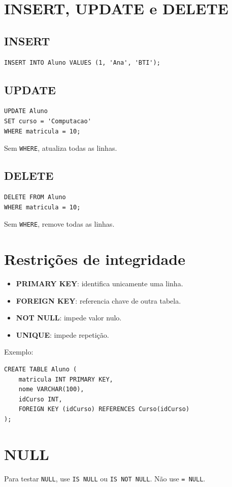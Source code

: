 \documentclass[12pt,a4paper]{article}
\begin{document}
\section{INSERT, UPDATE e DELETE}
\subsection{INSERT}
\begin{verbatim}
INSERT INTO Aluno VALUES (1, 'Ana', 'BTI');
\end{verbatim}

\subsection{UPDATE}
\begin{verbatim}
UPDATE Aluno
SET curso = 'Computacao'
WHERE matricula = 10;
\end{verbatim}
Sem \texttt{WHERE}, atualiza todas as linhas.

\subsection{DELETE}
\begin{verbatim}
DELETE FROM Aluno
WHERE matricula = 10;
\end{verbatim}
Sem \texttt{WHERE}, remove todas as linhas.

\section{Restrições de integridade}
\begin{itemize}
    \item \textbf{PRIMARY KEY}: identifica unicamente uma linha.
    \item \textbf{FOREIGN KEY}: referencia chave de outra tabela.
    \item \textbf{NOT NULL}: impede valor nulo.
    \item \textbf{UNIQUE}: impede repetição.
\end{itemize}

Exemplo:
\begin{verbatim}
CREATE TABLE Aluno (
    matricula INT PRIMARY KEY,
    nome VARCHAR(100),
    idCurso INT,
    FOREIGN KEY (idCurso) REFERENCES Curso(idCurso)
);
\end{verbatim}

\section{NULL}
Para testar \texttt{NULL}, use \texttt{IS NULL} ou \texttt{IS NOT NULL}. Não use \texttt{= NULL}.
\end{document}
